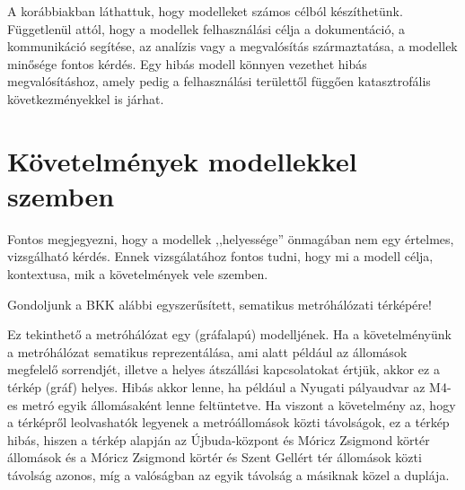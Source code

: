 \label{sec:modellek-ellenorzese}

\graphicspath{ {./modellek-ellenorzese/figures/} }

A korábbiakban láthattuk, hogy modelleket számos célból készíthetünk. Függetlenül attól, hogy a modellek felhasználási célja a dokumentáció, a kommunikáció segítése, az analízis vagy a megvalósítás származtatása, a modellek minősége fontos kérdés. Egy hibás modell könnyen vezethet hibás megvalósításhoz, amely pedig a felhasználási területtől függően katasztrofális következményekkel is járhat.



\section{Követelmények modellekkel szemben}

Fontos megjegyezni, hogy a modellek ,,helyessége'' önmagában nem egy értelmes, vizsgálható kérdés. Ennek vizsgálatához fontos tudni, hogy mi a modell célja, kontextusa, mik a követelmények vele szemben.

\begin{pelda}
	Gondoljunk a BKK alábbi egyszerűsített, sematikus metróhálózati térképére!

	Ez tekinthető a metróhálózat egy (gráfalapú) modelljének. Ha a követelményünk a metróhálózat sematikus reprezentálása, ami alatt például az állomások megfelelő sorrendjét, illetve a helyes átszállási kapcsolatokat értjük, akkor ez a térkép (gráf) helyes. Hibás akkor lenne, ha például a Nyugati pályaudvar az M4-es metró egyik állomásaként lenne feltüntetve. Ha viszont a követelmény az, hogy a térképről leolvashatók legyenek a metróállomások közti távolságok, ez a térkép hibás, hiszen a térkép alapján az Újbuda-központ és Móricz Zsigmond körtér állomások és a Móricz Zsigmond körtér és Szent Gellért tér állomások közti távolság azonos, míg a valóságban az egyik távolság a másiknak közel a duplája.
\end{pelda}

